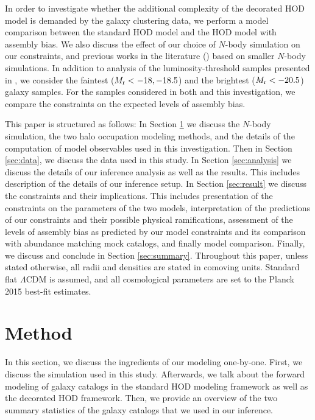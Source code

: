 \documentclass[twocolumn]{aastex61}
\begin{document}
In order to investigate whether the additional complexity of the decorated HOD model is demanded by the galaxy clustering data, we perform a model comparison between the standard HOD model and the HOD model with assembly bias. We also discuss the effect of our choice of $N$-body simulation on our constraints, and previous works in the literature (\citealt{zentner2016}) based on smaller $N$-body simulations. In addition to analysis of the luminosity-threshold samples presented in \citet{zentner2016}, we consider the faintest ($M_{\rm r} < -18,-18.5$) and the brightest ($M_{\rm r}<-20.5$) galaxy samples. For the samples considered in both \citet{zentner2016} and this investigation, we compare the constraints on the expected levels of assembly bias. 



This paper is structured as follows: In Section \ref{sec:method} we discuss the $N$-body simulation, the two halo occupation modeling methods, and the details of the computation of model observables used in this investigation. Then in Section \ref{sec:data}, we discuss the data used in this study. 
In Section \ref{sec:analysis} we discuss the details of our inference analysis as well as the results. This includes description of the details of our inference setup. In Section \ref{sec:result} we discuss the constraints and their implications. This includes presentation of the constraints on the parameters of the two models, interpretation of the predictions of our constraints and their possible physical ramifications, assessment of the levels of assembly bias as predicted by our model constraints and its comparison with abundance matching mock catalogs, and finally model comparison. Finally, we discuss and conclude in Section \ref{sec:summary}.
Throughout this paper, unless stated otherwise, 
all radii and densities are stated in comoving units. 
Standard flat $\Lambda$CDM is assumed, and all cosmological 
parameters are set to the Planck 2015 best-fit estimates.

\section{Method}\label{sec:method}

In this section, we discuss the ingredients of our modeling one-by-one. First, we discuss the simulation used in this study. Afterwards, we talk about the forward modeling of galaxy catalogs in the standard HOD modeling framework as well as the decorated HOD framework. Then, we provide an overview of the two summary statistics of the galaxy catalogs that we used in our inference.  
\end{document}
